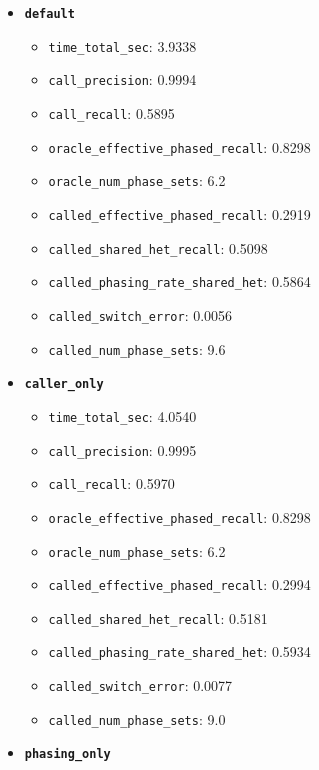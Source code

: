 \documentclass[
]{article}
\providecommand{\tightlist}{%
  \setlength{\itemsep}{0pt}\setlength{\parskip}{0pt}}
\begin{document}
\begin{itemize}
\tightlist
\item
  \textbf{\texttt{default}}

  \begin{itemize}
  \tightlist
  \item
    \texttt{time\_total\_sec}: 3.9338
  \item
    \texttt{call\_precision}: 0.9994
  \item
    \texttt{call\_recall}: 0.5895
  \item
    \texttt{oracle\_effective\_phased\_recall}: 0.8298
  \item
    \texttt{oracle\_num\_phase\_sets}: 6.2
  \item
    \texttt{called\_effective\_phased\_recall}: 0.2919
  \item
    \texttt{called\_shared\_het\_recall}: 0.5098
  \item
    \texttt{called\_phasing\_rate\_shared\_het}: 0.5864
  \item
    \texttt{called\_switch\_error}: 0.0056
  \item
    \texttt{called\_num\_phase\_sets}: 9.6
  \end{itemize}
\item
  \textbf{\texttt{caller\_only}}

  \begin{itemize}
  \tightlist
  \item
    \texttt{time\_total\_sec}: 4.0540
  \item
    \texttt{call\_precision}: 0.9995
  \item
    \texttt{call\_recall}: 0.5970
  \item
    \texttt{oracle\_effective\_phased\_recall}: 0.8298
  \item
    \texttt{oracle\_num\_phase\_sets}: 6.2
  \item
    \texttt{called\_effective\_phased\_recall}: 0.2994
  \item
    \texttt{called\_shared\_het\_recall}: 0.5181
  \item
    \texttt{called\_phasing\_rate\_shared\_het}: 0.5934
  \item
    \texttt{called\_switch\_error}: 0.0077
  \item
    \texttt{called\_num\_phase\_sets}: 9.0
  \end{itemize}
\item
  \textbf{\texttt{phasing\_only}}


\end{itemize}
\end{document}
